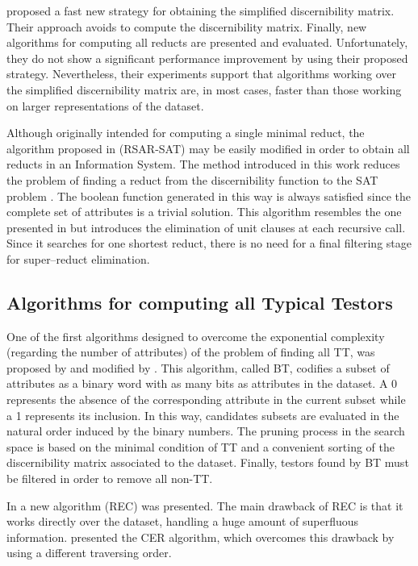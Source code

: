 \documentclass[authoryear,preprint,review,12pt]{elsarticle}
\begin{document}
  \cite{Chen2012} proposed a fast new strategy for obtaining the simplified discernibility matrix. Their approach avoids to compute the discernibility matrix. Finally, new algorithms for computing all reducts are presented and evaluated. Unfortunately, they do not show a significant performance improvement by using their proposed strategy. Nevertheless, their experiments support that algorithms working over the simplified discernibility matrix are, in most cases, faster than those working on larger representations of the dataset.
  
  Although originally intended for computing a single minimal reduct, the algorithm proposed in \linebreak 
  \citep{Jensen14} (RSAR-SAT) may be easily modified in order to obtain all reducts in an Information System. 
  The method introduced in this work reduces the problem of finding a reduct from the discernibility function 
  to the SAT problem \citep{Davis62}. The boolean function generated in this way is always satisfied since the
  complete set of attributes is a trivial solution. This algorithm resembles the one presented in \citep{Starzyk99}
  but introduces the elimination of unit clauses at each recursive call. Since it searches for one shortest
  reduct, there is no need for a final filtering stage for super--reduct elimination.

\subsection{Algorithms for computing all Typical Testors}
  One of the first algorithms designed to overcome the exponential complexity (regarding the number of attributes)
  of the problem of finding all TT, was proposed by \cite{Ruiz85} and modified by \cite{sanchez02}. This algorithm, called BT, codifies a subset of attributes as a binary word with as many bits as attributes in the dataset. A 0 represents the absence of the corresponding attribute in the current subset while a 1 represents its inclusion. In this way, candidates subsets are evaluated in the natural order induced by the binary numbers. The pruning process in the search space is based on the minimal condition of TT and a convenient sorting of the discernibility matrix associated to the dataset. Finally, testors found by BT must be filtered in order to remove all non-TT.
  
  In \citep{Shulcloper95b} a new algorithm (REC) was presented.
  The main drawback of REC is that it works directly over the dataset, handling a huge amount of superfluous
  information. \cite{Ayaquica97} presented the CER algorithm, which overcomes this drawback by using a different
  traversing order.  
  
\end{document}

